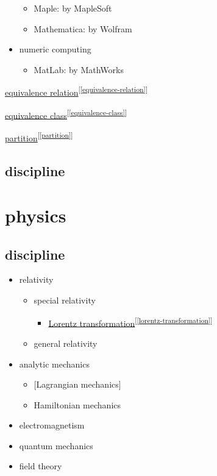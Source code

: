 \documentclass[
]{book}
\providecommand{\tightlist}{%
  \setlength{\itemsep}{0pt}\setlength{\parskip}{0pt}}
\theoremstyle{definition}
\theoremstyle{definition}
\theoremstyle{definition}
\theoremstyle{definition}
\theoremstyle{remark}
\begin{document}
\begin{itemize}
  \begin{itemize}
  \tightlist
  \item
    Maple: by MapleSoft
  \item
    Mathematica: by Wolfram
  \end{itemize}
\item
  numeric computing

  \begin{itemize}
  \tightlist
  \item
    MatLab: by MathWorks
  \end{itemize}
\end{itemize}

\protect\hyperlink{equivalence-relation}{equivalence relation}\textsuperscript{{[}\ref{equivalence-relation}{]}}

\protect\hyperlink{equivalence-class}{equivalence class}\textsuperscript{{[}\ref{equivalence-class}{]}}

\protect\hyperlink{partition}{partition}\textsuperscript{{[}\ref{partition}{]}}

\hypertarget{discipline}{%
\section{discipline}\label{discipline}}

\hypertarget{physics}{%
\chapter{physics}\label{physics}}

\hypertarget{discipline-1}{%
\section{discipline}\label{discipline-1}}

\begin{itemize}
\tightlist
\item
  relativity

  \begin{itemize}
  \tightlist
  \item
    special relativity

    \begin{itemize}
    \tightlist
    \item
      \protect\hyperlink{lorentz-transformation}{Lorentz transformation}\textsuperscript{{[}\ref{lorentz-transformation}{]}}
    \end{itemize}
  \item
    general relativity
  \end{itemize}
\item
  analytic mechanics

  \begin{itemize}
  \tightlist
  \item
    {[}Lagrangian mechanics{]}
  \item
    Hamiltonian mechanics
  \end{itemize}
\item
  electromagnetism
\item
  quantum mechanics
\item
  field theory
\end{itemize}
\end{document}
